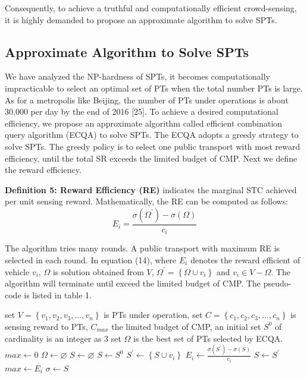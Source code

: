 \documentclass[journal]{IEEEtran}
\begin{document}
Consequently, to achieve a truthful and computationally efficient crowd-sensing, it is highly demanded to propose an approximate algorithm to solve SPTs.
\subsection{Approximate Algorithm to Solve SPTs}
We have analyzed the NP-hardness of SPTs, it becomes computationally impracticable to select an optimal set of PTs when the total number PTs is large. As for a metropolis like Beijing, the number of PTs under operations is about 30,000 per day by the end of 2016 [25]. To achieve a desired computational efficiency, we propose an approximate algorithm called efficient combination query algorithm (ECQA) to solve SPTs. The ECQA adopts a greedy strategy to solve SPTs. The greedy policy is to select one public transport with most reward efficiency, until the total SR exceeds the limited budget of CMP. Next we define the reward efficiency.

\noindent
\textbf{Definition 5: Reward Efficiency (RE)} indicates the marginal STC achieved per unit sensing reward. Mathematically, the RE can be computed as follows:
\begin{equation}
E_{i}=\frac{\sigma (\Omega ^{'})-\sigma (\Omega)}{c_{i}}
\end{equation}

The algorithm tries many rounds. A public transport with maximum RE is selected in each round. In equation (14), where $E_{i}$  denotes the reward efficient of vehicle $v_{i}$, $\Omega$ is solution obtained from $V$,  $\Omega ^{'}=\left \{ \Omega\cup v_{i}  \right \}$ and $v_{i}\in V-\Omega $. The algorithm will terminate until exceed the limited budget of CMP. The pseudo-code is listed in table 1.

\renewcommand{\algorithmicrequire}{\textbf{Input:}}
\renewcommand{\algorithmicensure}{\textbf{Output:}}
\begin{algorithm}
	\caption{}	
	\begin{algorithmic}
		\Require set $V=\left \{  v_{1},v_{2},v_{3},...,v_{n}\right \}$ is PTs under operation, set $C=\left \{  c_{1},c_{2},c_{3},...,c_{n}\right \}$ is sensing reward to PTs, $C_{max}$ the limited budget of CMP, an initial set $S^{0}$ of cardinality is an integer as 3
		\Ensure set $\Omega $ is the best set of PTs selected by ECQA. 
		\State $max \gets 0$
		\State $\Omega \gets \varnothing$
		\State $S \gets \varnothing$
			\State $S \gets S^{0}$
				\State $S^{'} \gets \left \{ S\cup v_{i} \right \}$
				\State $E_{i} \gets \frac{\sigma(S^{'})-\sigma (S)}{c_{i}}$
					\State $S \gets S^{'}$
					\State $max \gets E_{i}$
				\EndIf
					\State $ \sigma \gets S$
				\EndIf
			\EndFor		
		\EndFor				
	\end{algorithmic}
\end{algorithm}
\end{document}
